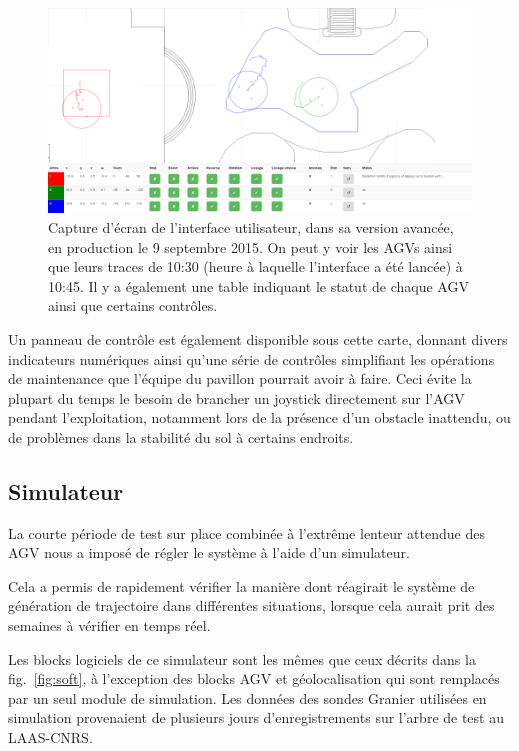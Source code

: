\documentclass[french,A4paper,]{book}
\begin{document}
\begin{figure}
\centering
\includegraphics[width=1.00000\textwidth]{imgs/real_sim.png}
\caption{Capture d'écran de l'interface utilisateur, dans sa version
avancée, en production le 9 septembre 2015. On peut y voir les AGVs
ainsi que leurs traces de 10:30 (heure à laquelle l'interface a été
lancée) à 10:45. Il y a également une table indiquant le statut de
chaque AGV ainsi que certains contrôles.}\label{fig:wui}
\end{figure}

Un panneau de contrôle est également disponible sous cette carte,
donnant divers indicateurs numériques ainsi qu'une série de contrôles
simplifiant les opérations de maintenance que l'équipe du pavillon
pourrait avoir à faire. Ceci évite la plupart du temps le besoin de
brancher un joystick directement sur l'AGV pendant l'exploitation,
notamment lors de la présence d'un obstacle inattendu, ou de problèmes
dans la stabilité du sol à certains endroits.

\subsection{Simulateur}\label{simulateur}

La courte période de test sur place combinée à l'extrême lenteur
attendue des AGV nous a imposé de régler le système à l'aide d'un
simulateur.

Cela a permis de rapidement vérifier la manière dont réagirait le
système de génération de trajectoire dans différentes situations,
lorsque cela aurait prit des semaines à vérifier en temps réel.

Les blocks logiciels de ce simulateur sont les mêmes que ceux décrits
dans la fig.~\ref{fig:soft}, à l'exception des blocks AGV et
géolocalisation qui sont remplacés par un seul module de simulation. Les
données des sondes Granier utilisées en simulation provenaient de
plusieurs jours d'enregistrements sur l'arbre de test au LAAS-CNRS.
\end{document}
